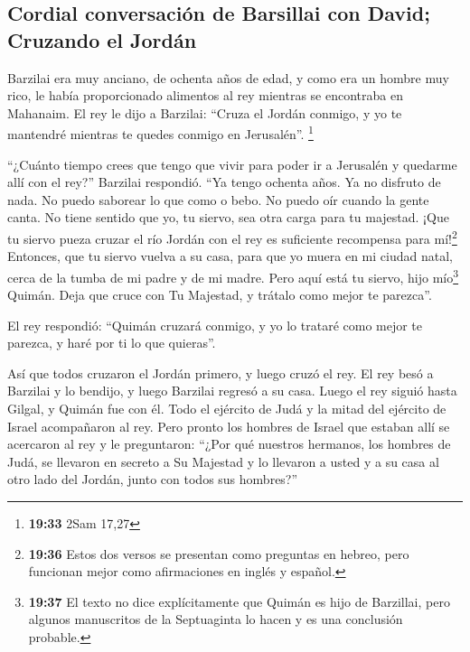 \hypertarget{cordial-conversaciuxf3n-de-barsillai-con-david-cruzando-el-jorduxe1n}{%
\subsection{Cordial conversación de Barsillai con David; Cruzando el
Jordán}\label{cordial-conversaciuxf3n-de-barsillai-con-david-cruzando-el-jorduxe1n}}

 Barzilai era muy anciano, de ochenta años de edad, y
como era un hombre muy rico, le había proporcionado alimentos al rey
mientras se encontraba en Mahanaim.  El rey le dijo a
Barzilai: ``Cruza el Jordán conmigo, y yo te mantendré mientras te
quedes conmigo en Jerusalén''. \footnote{\textbf{19:33} 2Sam 17,27}

 ``¿Cuánto tiempo crees que tengo que vivir para poder ir
a Jerusalén y quedarme allí con el rey?'' Barzilai respondió.
 ``Ya tengo ochenta años. Ya no disfruto de nada. No
puedo saborear lo que como o bebo. No puedo oír cuando la gente canta.
No tiene sentido que yo, tu siervo, sea otra carga para tu majestad.
 ¡Que tu siervo pueza cruzar el río Jordán con el rey es
suficiente recompensa para mí!\footnote{\textbf{19:36} Estos dos versos
  se presentan como preguntas en hebreo, pero funcionan mejor como
  afirmaciones en inglés y español.}  Entonces, que tu
siervo vuelva a su casa, para que yo muera en mi ciudad natal, cerca de
la tumba de mi padre y de mi madre. Pero aquí está tu siervo, hijo
mío\footnote{\textbf{19:37} El texto no dice explícitamente que Quimán
  es hijo de Barzillai, pero algunos manuscritos de la Septuaginta lo
  hacen y es una conclusión probable.} Quimán. Deja que cruce con Tu
Majestad, y trátalo como mejor te parezca''.

 El rey respondió: ``Quimán cruzará conmigo, y yo lo
trataré como mejor te parezca, y haré por ti lo que quieras''.

 Así que todos cruzaron el Jordán primero, y luego cruzó
el rey. El rey besó a Barzilai y lo bendijo, y luego Barzilai regresó a
su casa.  Luego el rey siguió hasta Gilgal, y Quimán fue
con él. Todo el ejército de Judá y la mitad del ejército de Israel
acompañaron al rey.  Pero pronto los hombres de Israel
que estaban allí se acercaron al rey y le preguntaron: ``¿Por qué
nuestros hermanos, los hombres de Judá, se llevaron en secreto a Su
Majestad y lo llevaron a usted y a su casa al otro lado del Jordán,
junto con todos sus hombres?''

